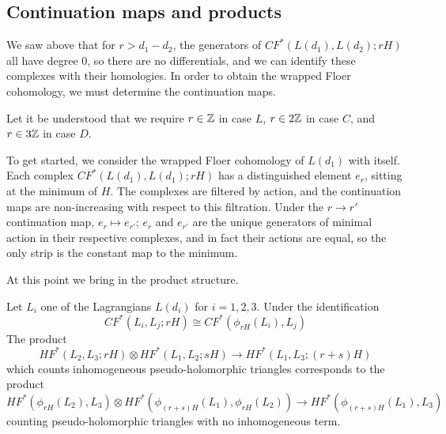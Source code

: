 \documentclass[12pt]{amsart}
\begin{document}
\subsection{Continuation maps and products}
\label{sec:continuation-product}

We saw above that for $r > d_1-d_2$, the generators of $CF^*(L(d_1),L(d_2);rH)$ all
have degree $0$, so there are no differentials, and we can
identify these complexes with their homologies. In order to obtain the
wrapped Floer cohomology, we must determine the continuation
maps.

Let it be understood that we require $r \in \mathbb{Z}$ in case $L$, $r \in
2\mathbb{Z}$ in case $C$, and $r \in 3\mathbb{Z}$ in case $D$.

To get started, we consider the wrapped Floer cohomology of $L(d_1)$
with itself. Each complex $CF^*(L(d_1),L(d_1);rH)$ has a distinguished
element $e_r$, sitting at the minimum of $H$. The complexes are
filtered by action, and the continuation maps are non-increasing with
respect to this filtration. Under the $r \to r'$ continuation map,
$e_r \mapsto e_{r'}$; $e_r$ and $e_{r'}$ are the unique generators of
minimal action in their respective complexes, and in fact their
actions are equal, so the only strip is the constant map to the
minimum.

At this point we bring in the product structure.

\begin{proposition}
 Let $L_i$ one of the Lagrangians $L(d_i)$ for $i = 1, 2, 3$. Under the identification
  \begin{equation}
  CF^*(L_i,L_j;rH) \cong CF^*(\phi_{rH}(L_i),L_j) 
\end{equation}
The product 
\begin{equation}
  HF^*(L_2,L_3; rH) \otimes HF^*(L_1,L_2; sH) \to HF^*(L_1,L_3; (r+s)H)
\end{equation}
which counts inhomogeneous pseudo-holomorphic triangles corresponds to the product
\begin{equation}
  HF^*(\phi_{rH}(L_2),L_3) \otimes
  HF^*(\phi_{(r+s)H}(L_1),\phi_{rH}(L_2)) \to HF^*(\phi_{(r+s)H}(L_1),L_3)
\end{equation}
counting pseudo-holomorphic triangles with no inhomogeneous term.
\end{proposition}
\end{document}
